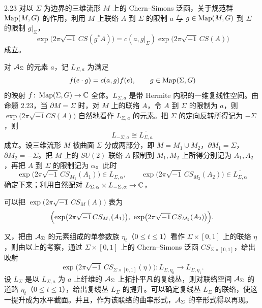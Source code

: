 \begin{proposition}{2.23}
  对以 $\Sigma$ 为边界的三维流形 $M$ 上的 Chern--Simons 泛函，关于规范群 $\operatorname{Map}(M,G)$ 的作用，利用 $M$ 上联络 $A$ 到 $\Sigma$ 的限制 $a$ 与 $g\in\operatorname{Map}(M,G)$ 到 $\Sigma$ 的限制 $g|_{\Sigma}$，
  \begin{equation}
    \exp\bigl(2\pi\sqrt{-1}\,CS(g^{*}A)\bigr)=c(a,g|_{\Sigma})\exp\bigl(2\pi\sqrt{-1}\,CS(A)\bigr) \tag{2.40}
  \end{equation}
  成立。
\end{proposition}

对 $\mathcal{A}_\Sigma$ 的元素 $a$，记 $L_{\Sigma,a}$ 为满足
\begin{equation*}
  f(e\cdot g)=c(a,g)f(e),\qquad g\in\operatorname{Map}(\Sigma,G)
\end{equation*}
的映射 $f\colon\operatorname{Map}(\Sigma,G)\to\mathbb{C}$ 全体。$L_{\Sigma,a}$ 是带 Hermite 内积的一维复线性空间。由命题 2.23，当 $\partial M=\Sigma$ 时，对 $M$ 上的联络 $A$，令 $A$ 到 $\Sigma$ 的限制为 $a$，则 $\exp\bigl(2\pi\sqrt{-1}CS(A)\bigr)$ 自然地看作 $L_{\Sigma,a}$ 的元素。把 $\Sigma$ 的定向反转所得记为 $-\Sigma$，则
\begin{equation*}
  L_{-\Sigma,a}\cong\overline{L_{\Sigma,a}}
\end{equation*}
成立。设三维流形 $M$ 被曲面 $\Sigma$ 分成两部分，即 $M=M_1\cup M_2$，$\partial M_1=\Sigma$，$\partial M_2=-\Sigma$。把 $M$ 上的 $SU(2)$ 联络 $A$ 限制到 $M_1,M_2$ 上所得分别记为 $A_1,A_2$，再把 $A$ 到 $\Sigma$ 的限制记为 $\alpha$。此时
\begin{equation*}
  \exp\bigl(2\pi\sqrt{-1}\,CS_{M_1}(A_1)\bigr)\in L_{\Sigma,\alpha},\qquad
  \exp\bigl(2\pi\sqrt{-1}\,CS_{M_2}(A_2)\bigr)\in\overline{L_{\Sigma,\alpha}}
\end{equation*}
确定下来；利用自然配对 $L_{\Sigma,\alpha}\times L_{-\Sigma,\alpha}\to\mathbb{C}$，



可以把 $\exp\bigl(2\pi\sqrt{-1}\,CS_M(A)\bigr)$ 表为
\begin{equation*}
  \Bigl(\exp\bigl(2\pi\sqrt{-1}\,CS_{M_1}(A_1)\bigr),\ \exp\bigl(2\pi\sqrt{-1}\,CS_{M_2}(A_2)\bigr)\Bigr).
\end{equation*}

又，把由 $\mathcal{A}_\Sigma$ 的元素组成的单参数族 $\eta_t$（$0\le t\le 1$）看作 $\Sigma\times[0,1]$ 上的联络 $\eta$，则由以上的考察，通过 $\Sigma\times[0,1]$ 上的 Chern--Simons 泛函 $CS_{\Sigma\times[0,1]}$，给出映射
\begin{equation*}
  \exp\bigl(2\pi\sqrt{-1}\,CS_{\Sigma\times[0,1]}(\eta)\bigr)\colon L_{\Sigma,\eta_0}\longrightarrow L_{\Sigma,\eta_1}.
\end{equation*}
设 $L_\Sigma$ 是以 $L_{\Sigma,a}$ 为 $a$ 上纤维的 $\mathcal{A}_\Sigma$ 上拓扑平凡的复线丛，则对联络空间 $\mathcal{A}_\Sigma$ 的道路 $\eta_t$（$0\le t\le 1$），给出复线丛 $L_\Sigma$ 的提升。可以确定复线丛 $L_\Sigma$ 的联络，使这一提升成为水平截面。并且，作为该联络的曲率形式，$\mathcal{A}_\Sigma$ 的辛形式得以再现。

